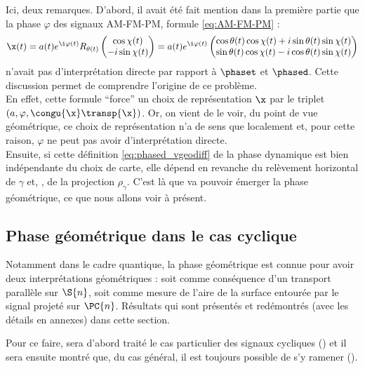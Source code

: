 Ici, deux remarques. D'abord, il avait été fait mention dans la première partie que la phase $\varphi$ des signaux AM-FM-PM, formule \eqref{eq:AM-FM-PM} :
\[\x(t) = a(t)e^{\i \varphi(t)} R_{\theta(t)} \begin{pmatrix} \cos\chi(t) \\ -i\sin\chi(t) \end{pmatrix} 
= a(t)e^{\i \varphi(t)} \begin{pmatrix} \cos\theta(t) \cos\chi(t) + i\sin\theta(t) \sin\chi(t) \\ \sin\theta(t) \cos\chi(t) - i\cos\theta(t) \sin\chi(t) \end{pmatrix}\]
n'avait pas d'interprétation directe par rapport à $\phaset$ et $\phased$.
Cette discussion permet de comprendre l'origine de ce problème.
\\
En effet, cette formule ``force'' un choix de représentation $\x$ par le triplet $(a, \varphi, \congu{\x}\transp{\x})$.
Or, on vient de le voir, du point de vue géométrique, ce choix de représentation n'a de sens que localement et, pour cette raison, $\varphi$ ne peut pas avoir d'interprétation directe.
\\

Ensuite, si cette définition \eqref{eq:phased_vgeodiff} de la phase dynamique est bien indépendante du choix de carte, elle dépend en revanche du relèvement horizontal de $\gamma$ et, \afortiori, de la projection $\rho_\gamma$. C'est là que va pouvoir émerger la phase géométrique, ce que nous allons voir à présent.
\\



\subsection{Phase géométrique dans le cas cyclique} \label{subsec:phase_g-cycl}

Notamment dans le cadre quantique, la phase géométrique est connue pour avoir deux interprétations géométriques \cite{bohm_geometric_2003, chruscinski_geometric_2004,faure_introduction_2022} : soit comme conséquence d'un transport parallèle sur $\S{n}$, soit comme mesure de l'aire de la surface entourée par le signal projeté sur $\PC{n}$. Résultats qui sont présentés et redémontrés (avec les détails en annexes) dans cette section.

Pour ce faire, sera d'abord traité le cas particulier des signaux cycliques () et il sera ensuite montré que, du cas général, il est toujours possible de s'y ramener ().
\skipl



